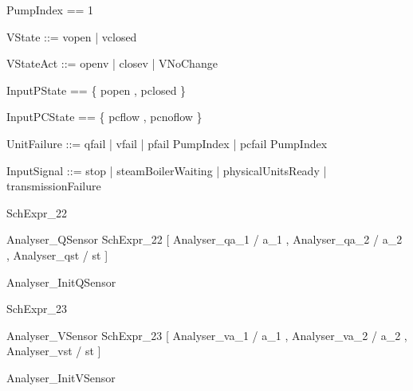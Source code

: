\documentclass{article}
\begin{document}
\begin{zed}
	PumpIndex == 1 
\end{zed}

\begin{zed}
	VState ::= vopen | vclosed
\end{zed}

\begin{zed}
	VStateAct ::= openv | closev | VNoChange
\end{zed}

\begin{zed}
	InputPState == \{ popen , pclosed \}
\end{zed}

\begin{zed}
	InputPCState == \{ pcflow , pcnoflow \}
\end{zed}

\begin{zed}
	UnitFailure ::= qfail | vfail | pfail \ldata PumpIndex \rdata | pcfail \ldata PumpIndex \rdata
\end{zed}

\begin{zed}
	InputSignal ::= stop | steamBoilerWaiting | physicalUnitsReady | transmissionFailure
\end{zed}

\begin{zed}
	SchExpr\_22 
\end{zed}

\begin{zed}
	Analyser\_QSensor  SchExpr\_22 [ Analyser\_qa\_1 / a\_1 , Analyser\_qa\_2 / a\_2 , Analyser\_qst / st ]
\end{zed}

\begin{zed}
	Analyser\_InitQSensor 
\end{zed}

\begin{zed}
	SchExpr\_23 
\end{zed}

\begin{zed}
	Analyser\_VSensor  SchExpr\_23 [ Analyser\_va\_1 / a\_1 , Analyser\_va\_2 / a\_2 , Analyser\_vst / st ]
\end{zed}

\begin{zed}
	Analyser\_InitVSensor 
\end{zed}
\end{document}
